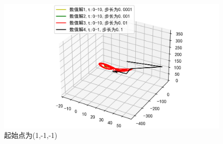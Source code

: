 \documentclass[a4paper]{article}%
\begin{document}
\begin{figure}[H]
    \centering
    \includegraphics[scale=0.8]{75}
    \caption{起始点为(1,-1,-1)}
\end{figure}
\end{document}
